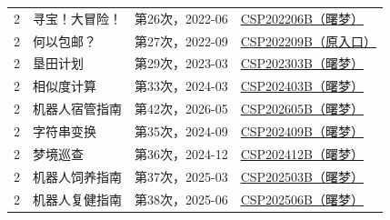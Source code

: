 \begin{longtable}{P{1cm}P{3.7cm}P{2.8cm}P{6cm}}
2 & 寻宝！大冒险！ & 第26次，2022-06 & \href{https://oj.shumeng.tech/p/CSP202206B}{CSP202206B（曙梦）}\\
2 & 何以包邮？ & 第27次，2022-09 & \href{https://www.acwing.com/problem/content/4703/}{CSP202209B（原入口）}\\
2 & 垦田计划 & 第29次，2023-03 & \href{https://oj.shumeng.tech/p/CSP202303B}{CSP202303B（曙梦）}\\
2 & 相似度计算 & 第33次，2024-03 & \href{https://oj.shumeng.tech/p/CSP202403B}{CSP202403B（曙梦）}\\
2 & 机器人宿管指南 & 第42次，2026-05 & \href{https://oj.shumeng.tech/p/CSP202605B}{CSP202605B（曙梦）}\\
2 & 字符串变换 & 第35次，2024-09 & \href{https://oj.shumeng.tech/p/CSP202409B}{CSP202409B（曙梦）}\\
2 & 梦境巡查 & 第36次，2024-12 & \href{https://oj.shumeng.tech/p/CSP202412B}{CSP202412B（曙梦）}\\
2 & 机器人饲养指南 & 第37次，2025-03 & \href{https://oj.shumeng.tech/p/CSP202503B}{CSP202503B（曙梦）}\\
2 & 机器人复健指南 & 第38次，2025-06 & \href{https://oj.shumeng.tech/p/CSP202506B}{CSP202506B（曙梦）}\\
\bottomrule\end{longtable}

